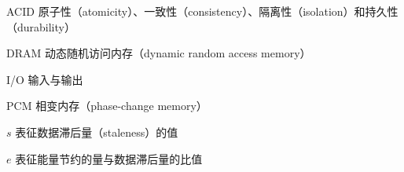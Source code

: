\begin{denotation}
\item[ACID] 原子性（atomicity）、一致性（consistency）、隔离性（isolation）和持久性（durability）
\item[DRAM] 动态随机访问内存（dynamic random access memory）
\item[I/O] 输入与输出
\item[PCM] 相变内存（phase-change memory）
\item[$s$] 表征数据滞后量（staleness）的值
\item[$e$] 表征能量节约的量与数据滞后量的比值
\end{denotation}
